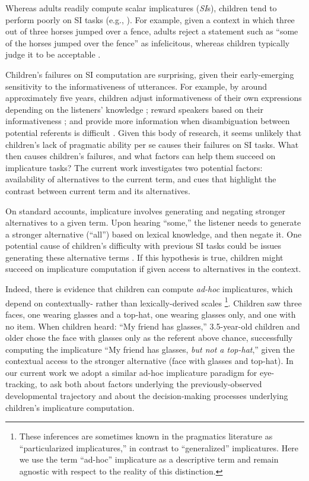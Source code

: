 \documentclass[10pt,letterpaper]{article}
\begin{document}
Whereas adults readily compute scalar implicatures (\emph{SI}s), children tend to perform poorly on SI tasks (e.g., ). For example, given a context in which three out of three horses jumped over a fence, adults reject a statement such as ``some of the horses jumped over the fence'' as infelicitous, whereas children typically judge it to be acceptable \cite{papafragou2003scalar}. 

Children's failures on SI computation are surprising, given their early-emerging sensitivity to the informativeness of utterances. For example, by around approximately five years, children adjust informativeness of their own expressions depending on the listeners' knowledge \cite{matthews2006effect}; reward speakers based on their informativeness \cite{katsos2011pragmatic}; and provide more information when disambiguation between potential referents is difficult \cite{matthews2012two}. Given this body of research, it seems unlikely that children's lack of pragmatic ability per se causes their failures on SI tasks. What then causes children's failures, and what factors can help them succeed on implicature tasks? The current work investigates two potential factors: availability of alternatives to the current term, and cues that highlight the contrast between current term and its alternatives.

On standard accounts, implicature involves generating and negating stronger alternatives to a given term. Upon hearing ``some,'' the listener needs to generate a stronger alternative (``all'') based on lexical knowledge, and then negate it. One potential cause of children's difficulty with previous SI tasks could be issues generating these alternative terms \cite{barner2011accessing}. If this hypothesis is true, children might succeed on implicature computation if given access to alternatives in the context.

Indeed, there is evidence that children can compute \emph{ad-hoc} implicatures, which depend on contextually- rather than lexically-derived scales \cite{stillerLLD}\footnote{These inferences are sometimes known in the pragmatics literature as ``particularized implicatures,'' in contrast to ``generalized'' implicatures. Here we use the term ``ad-hoc'' implicature as a descriptive term and remain agnostic with respect to the reality of this distinction.}. Children saw three faces, one wearing glasses and a top-hat, one wearing glasses only, and one with no item. When children heard: ``My friend has glasses,'' 3.5-year-old children and older chose the face with glasses only as the referent above chance, successfully computing the implicature ``My friend has glasses, \emph{but not a top-hat},'' given the contextual access to the stronger alternative (face with glasses and top-hat). In our current work we adopt a similar ad-hoc implicature paradigm for eye-tracking, to ask both about factors underlying the previously-observed developmental trajectory and about the decision-making processes underlying children's implicature computation. 
\end{document}
